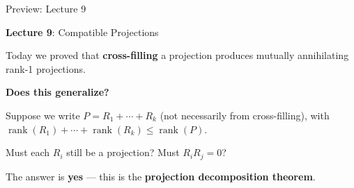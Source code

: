\documentclass[10pt]{beamer}
\theoremstyle{definition}
\newcommand{\x}[1]{\alert{\textbf{#1}}}
\begin{document}
\begin{frame}{Preview: Lecture 9}

\x{Lecture 9}: Compatible Projections

\vspace{1em}

Today we proved that \x{cross-filling} a projection produces mutually annihilating rank-1 projections.

\vspace{0.5em}

\x{Does this generalize?}

\vspace{0.5em}

Suppose we write $P = R_1 + \cdots + R_k$ (not necessarily from cross-filling), with $\operatorname{rank}(R_1) + \cdots + \operatorname{rank}(R_k) \leq \operatorname{rank}(P)$.

\vspace{0.5em}

Must each $R_i$ still be a projection? Must $R_i R_j = 0$?

\vspace{1em}

The answer is \x{yes} --- this is the \x{projection decomposition theorem}.

\end{frame}
\end{document}
